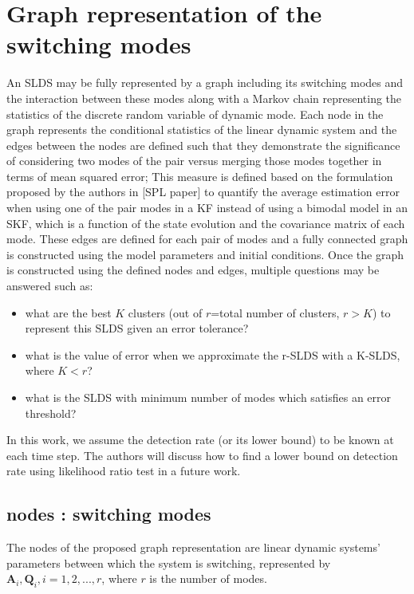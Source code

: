\documentclass[journal]{IEEEtran}
\begin{document}
\section{Graph representation of the switching modes}\label{section:graph}
An SLDS may be fully represented by a graph including its switching modes and the interaction between these modes along with a Markov chain representing the statistics of the discrete random variable of dynamic mode. Each node in the graph represents the conditional statistics of the linear dynamic system and the edges between the nodes are defined such that they demonstrate the significance of considering two modes of the pair versus merging those modes together in terms of mean squared error; This measure is defined based on the formulation proposed by the authors in [SPL paper] to quantify the average estimation error when using one of the pair modes in a KF instead of using a bimodal model in an SKF, which is a function of the state evolution and the covariance matrix of each mode. These edges are defined for each pair of modes and a fully connected graph is constructed using the model parameters and initial conditions. Once the graph is constructed using the defined nodes and edges, multiple questions may be answered such as: 
 \begin{itemize}
     \item  what are the best $K$ clusters (out of $r$=total number of clusters, $r>K$) to represent this SLDS given an error tolerance?
     \item what is the value of error when we approximate the r-SLDS with a K-SLDS, where $K<r$?
     \item what is the SLDS with minimum number of modes which satisfies an error threshold? 
 \end{itemize}
 
 In this work, we assume the detection rate (or its lower bound) to be known at each time step. The authors will discuss how to find a lower bound on detection rate using likelihood ratio test in a future work. 
 \subsection{nodes : switching modes}
 The nodes of the proposed graph representation are linear dynamic systems' parameters between which the system is switching, represented by $\bm{A}_i,\bm{Q}_i, i=1,2,...,r$, where $r$ is the number of modes. 
\end{document}
